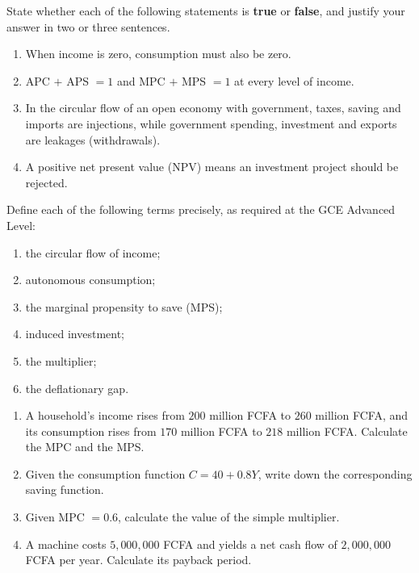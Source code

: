 \documentclass[11pt]{article}
\begin{document}
\begin{exercice}
State whether each of the following statements is \textbf{true} or \textbf{false}, and justify your answer in two or three sentences.
\begin{enumerate}
\item When income is zero, consumption must also be zero.
\item APC $+$ APS $= 1$ and MPC $+$ MPS $= 1$ at every level of income.
\item In the circular flow of an open economy with government, taxes, saving and imports are injections, while government spending, investment and exports are leakages (withdrawals).
\item A positive net present value (NPV) means an investment project should be rejected.
\end{enumerate}
\end{exercice}

\begin{exercice}[Definitions]
Define each of the following terms precisely, as required at the GCE Advanced Level:
\begin{enumerate}
\item the circular flow of income;
\item autonomous consumption;
\item the marginal propensity to save (MPS);
\item induced investment;
\item the multiplier;
\item the deflationary gap.
\end{enumerate}
\end{exercice}

\begin{exercice}
\begin{enumerate}
\item A household's income rises from $200$ million FCFA to $260$ million FCFA, and its consumption rises from $170$ million FCFA to $218$ million FCFA. Calculate the MPC and the MPS.
\item Given the consumption function $C = 40 + 0.8Y$, write down the corresponding saving function.
\item Given MPC $= 0.6$, calculate the value of the simple multiplier.
\item A machine costs $5{,}000{,}000$ FCFA and yields a net cash flow of $2{,}000{,}000$ FCFA per year. Calculate its payback period.
\end{enumerate}
\end{exercice}
\end{document}
